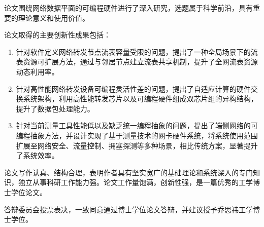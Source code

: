 \fancyfoot[LE,RO]{}


论文围绕网络数据平面的可编程硬件进行了深入研究，选题属于科学前沿，具有重要的理论意义和使用价值。

论文取得的主要创新性成果包括：
\begin{enumerate}
	\item 针对软件定义网络转发节点流表容量受限的问题，提出了一种全局场景下的流表资源可扩展方法，通过与邻居节点建立流表共享机制，提升了全网流表资源动态利用率。
	\item 针对高性能网络转发设备可编程灵活性差的问题，提出了自适应计算的硬件交换系统架构，利用高性能转发芯片以及可编程硬件组成双芯片组的异构结构，提升了数据包处理能力。
	\item 针对当前测量工具性能低以及缺乏统一编程抽象的问题，提出了端侧网络的可编程抽象方法，并设计实现了基于测量技术的网卡硬件系统，将系统使用范围扩展至网络安全、流量控制、拥塞探测等多种场景，相比传统方案，显著提升了系统效率。
\end{enumerate}

论文写作认真、结构合理，表明作者具有坚实宽广的基础理论和系统深入的专门知识，独立从事科研工作能力强。论文工作量饱满，创新性强，是一篇优秀的工学博士学位论文。

答辩委员会投票表决，一致同意通过博士学位论文答辩，并建议授予乔思祎工学博士学位。




%


